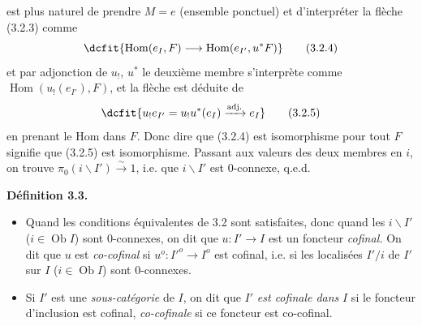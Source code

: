 \documentclass[11pt]{article}
\def\dcprintedpending{}
\newcommand{\dcjoinedprintedpage}[1]{\gdef\dcprintedpending{#1}}
\newcommand{\msp}[1]{\marginpar{\footnotesize\raggedright
  \ifx\dcprintedpending\empty\else p.~\dcprintedpending\par\fi
  [#1]}\gdef\dcprintedpending{}}
\newcommand{\Hom}{\operatorname{Hom}}
\newcommand{\Ob}{\operatorname{Ob}}
\newcommand{\bs}{\backslash}
\begin{document}
\dcjoinedprintedpage{29}

\msp{page 45}
est plus naturel de prendre $M = e$ (ensemble ponctuel) et d'interpréter la flèche (3.2.3) comme
\[
\dcfit{\Hom(e_I, F) \longrightarrow \Hom(e_{I'}, u^*F)
}
\tag*{(3.2.4)}
\]
et par adjonction de $u_!$, $u^*$ le deuxième membre s'interprète comme $\Hom(u_!(e_{I'}), F)$, et la flèche est déduite de
\[
\dcfit{u_!e_{I'} = u_!u^*(e_I) \xrightarrow{\text{adj.}} e_I
}
\tag*{(3.2.5)}
\]
en prenant le Hom dans $F$. Donc dire que (3.2.4) est isomorphisme pour tout $F$ signifie que (3.2.5) est isomorphisme. Passant aux valeurs des deux membres en $i$, on trouve $\pi_0(i\bs I') \xrightarrow{\sim} 1$, i.e. que $i\bs I'$ est 0-connexe, q.e.d.

\noindent\textbf{Définition 3.3.}
\begin{itemize}[label={}]
\item[a)] Quand les conditions équivalentes de 3.2 sont satisfaites, donc quand les $i\bs I'$ ($i \in \Ob I$) sont 0-connexes, on dit que $u : I' \longrightarrow I$ est un foncteur \textit{cofinal.} On dit que $u$ est \textit{co-cofinal} si $u^o : I'^o \longrightarrow I^o$ est cofinal, i.e. si les localisées $I'/i$ de $I'$ sur $I$ ($i \in \Ob I$) sont 0-connexes.
\item[b)] Si $I'$ est une \textit{sous-catégorie} de $I$, on dit que $I'$ \textit{est cofinale dans} $I$ si le foncteur d'inclusion est cofinal, \textit{co-cofinale} si ce foncteur est co-cofinal.
\end{itemize}
\end{document}
